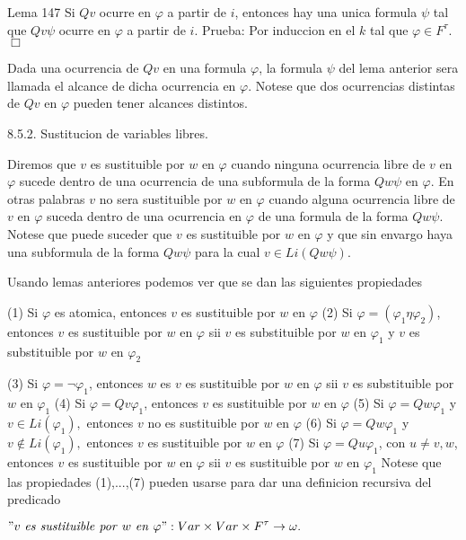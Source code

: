 Lema 147 Si \(Qv\) ocurre en \(\varphi \) a partir de \(i\), entonces hay una unica formula \(\psi \) tal que \(Qv\psi \) ocurre en \(\varphi \) a partir de \(i\).
Prueba: Por induccion en el \(k\) tal que \(\varphi \in F^{\tau }\). \(\Box\)

Dada una ocurrencia de \(Qv\) en una formula \(\varphi \), la formula \(\psi \) del lema anterior sera llamada el alcance de dicha ocurrencia en \( \varphi \). Notese que dos ocurrencias distintas de \(Qv\) en \(\varphi \) pueden tener alcances distintos.

8.5.2. Sustitucion de variables libres.

Diremos que \(v\) es sustituible por \(w\) en \(\varphi \) cuando ninguna ocurrencia libre de \(v\) en \(\varphi \) sucede dentro de una ocurrencia de una subformula de la forma \(Qw\psi \) en \(\varphi \). En otras palabras \(v\) no sera sustituible por \(w\) en \(\varphi \) cuando alguna ocurrencia libre de \(v\) en \(\varphi \) suceda dentro de una ocurrencia en \( \varphi \) de una formula de la forma \(Qw\psi \). Notese que puede suceder que \(v\) es sustituible por \(w\) en \(\varphi \) y que sin envargo haya una subformula de la forma \(Qw\psi \) para la cual \(v\in Li(Qw\psi )\).

Usando lemas anteriores podemos ver que se dan las siguientes propiedades

(1) Si \(\varphi \) es atomica, entonces \(v\) es sustituible por \(w\) en \( \varphi \)
(2) Si \(\varphi =(\varphi _{1}\eta \varphi _{2})\), entonces \(v\) es sustituible por \(w\) en \(\varphi \) sii \(v\) es substituible por \(w\) en \( \varphi _{1}\) y \(v\) es
substituible por \(w\) en \(\varphi _{2}\)

(3) Si \(\varphi =\lnot \varphi _{1}\), entonces \(w\) es \(v\) es sustituible por \(w\) en \(\varphi \) sii \(v\) es substituible por \(w\) en \( \varphi _{1}\)
(4) Si \(\varphi =Qv\varphi _{1}\), entonces \(v\) es sustituible por \(w\) en \(\varphi \)
(5) Si \(\varphi =Qw\varphi _{1}\) y \(v\in Li(\varphi _{1}),\) entonces \( v\) no es sustituible por \(w\) en \(\varphi \)
(6) Si \(\varphi =Qw\varphi _{1}\) y \(v\not\in Li(\varphi _{1}),\) entonces \(v\) es sustituible por \(w\) en \(\varphi \)
(7) Si \(\varphi =Qu\varphi _{1}\), con \(u\neq v,w\), entonces \(v\) es sustituible por \(w\) en \(\varphi \) sii \(v\) es sustituible por \(w\) en \(\varphi _{1}\)
Notese que las propiedades (1),...,(7) pueden usarse para dar una definicion recursiva del predicado

\(\displaystyle "v\text{ }\mathit{es\ sustituible\ por\ }w\mathit{\ en}\text{ }\varphi ":Var\times Var\times F^{\tau }\rightarrow \omega . \)

